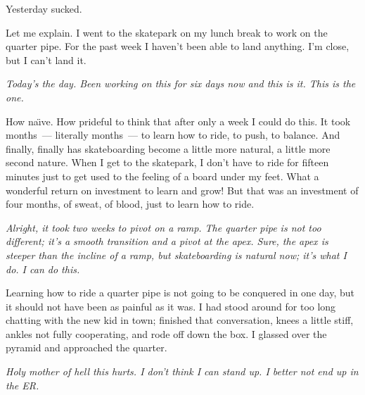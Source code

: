 Yesterday sucked.

Let me explain. I went to the skatepark on my lunch break to work on the quarter pipe. For the past week I haven't been able to land anything. I'm close, but I can't land it.

\emph{Today's the day. Been working on this for six days now and this is it. This is the one.}

How na\"\i{}ve. How prideful to think that after only a week I could do this. It took months~--- literally months~--- to learn how to ride, to push, to balance. And finally, finally has skateboarding become a little more natural, a little more second nature. When I get to the skatepark, I don't have to ride for fifteen minutes just to get used to the feeling of a board under my feet. What a wonderful return on investment to learn and grow! But that was an investment of four months, of sweat, of blood, just to learn how to ride.

\emph{Alright, it took two weeks to pivot on a ramp. The quarter pipe is not too different; it's a smooth transition and a pivot at the apex. Sure, the apex is steeper than the incline of a ramp, but skateboarding is natural now; it's what I do. I can do this.}

Learning how to ride a quarter pipe is not going to be conquered in one day, but it should not have been as painful as it was. I had stood around for too long chatting with the new kid in town; finished that conversation, knees a little stiff, ankles not fully cooperating, and rode off down the box. I glassed over the pyramid and approached the quarter.

\emph{Holy mother of hell this hurts. I don't think I can stand up. I better not end up in the ER.}
